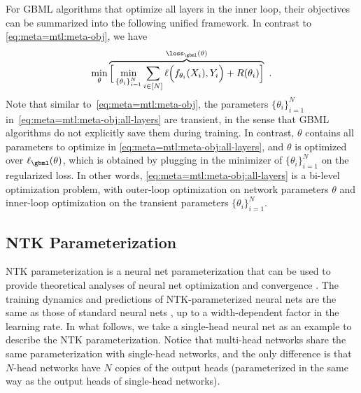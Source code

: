 \documentclass{article}
\begin{document}
For GBML algorithms that optimize all layers in the inner loop, their objectives can be summarized into the following unified framework. In contrast to \eqref{eq:meta=mtl:meta-obj}, we have
\begin{align}\label{eq:meta=mtl:meta-obj:all-layers}
    \min_{\theta} \overbrace{\Big[\min_{\{\theta_i\}_{i=1}^N} \sum_{i\in[N]} \ell \Big(f_{\theta_i}(X_i), Y_{i}\Big) + R(\theta_i)\Big]}^{\loss_\gbml(\theta)}~.
\end{align}
Note that similar to~\eqref{eq:meta=mtl:meta-obj}, the parameters $\{\theta_i\}_{i=1}^N$ in~\eqref{eq:meta=mtl:meta-obj:all-layers} are transient, in the sense that GBML algorithms do not explicitly save them during training. In contrast, $\theta$ contains all parameters to optimize in \eqref{eq:meta=mtl:meta-obj:all-layers}, and $\theta$ is optimized over $\ell_\gbml(\theta)$, which is obtained by plugging in the minimizer of $\{\theta_i\}_{i=1}^N$ on the regularized loss. In other words, \eqref{eq:meta=mtl:meta-obj:all-layers} is a bi-level optimization problem, with outer-loop optimization on network parameters $\theta$ and inner-loop optimization on the transient parameters $\{\theta_i\}_{i=1}^N$.

\subsection{NTK Parameterization}\label{supp:background:ntk-parameterization}
NTK parameterization is a neural net parameterization that can be used to provide theoretical analyses of neural net optimization and convergence \cite{lee2019wide,xiao2020dis}. The training dynamics and predictions of NTK-parameterized neural nets are the same as those of standard neural nets \cite{lee2019wide}, up to a width-dependent factor in the learning rate. In what follows, we take a single-head neural net as an example to describe the NTK parameterization. Notice that multi-head networks share the same parameterization with single-head networks, and the only difference is that $N$-head networks have $N$ copies of the output heads (parameterized in the same way as the output heads of single-head networks).
\end{document}
